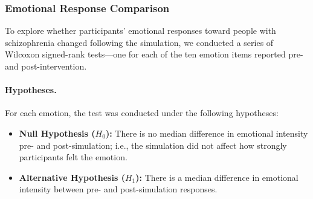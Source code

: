 





\subsubsection{Emotional Response Comparison}

To explore whether participants’ emotional responses toward people with schizophrenia changed following the simulation, we conducted a series of Wilcoxon signed-rank tests—one for each of the ten emotion items reported pre- and post-intervention.

\paragraph{Hypotheses.} For each emotion, the test was conducted under the following hypotheses:
\begin{itemize}
    \item \textbf{Null Hypothesis ($H_0$):} There is no median difference in emotional intensity pre- and post-simulation; i.e., the simulation did not affect how strongly participants felt the emotion.
    \item \textbf{Alternative Hypothesis ($H_1$):} There is a median difference in emotional intensity between pre- and post-simulation responses.
\end{itemize}


